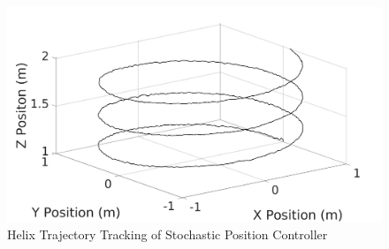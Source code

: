     \begin{figure}[H]
            \centering
            \includegraphics[width=1\textwidth]{plots/traj1.jpg}
            \caption{Helix Trajectory Tracking of Stochastic Position Controller}
            \label{traj1}
    \end{figure}\clearpage
